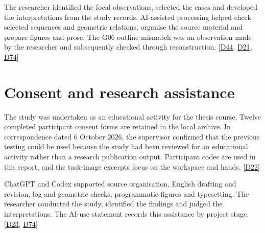 The researcher identified the focal observations, selected the cases and developed the interpretations from the study records. AI-assisted processing helped check selected sequences and geometric relations, organise the source material and prepare figures and prose. The G06 outline mismatch was an observation made by the researcher and subsequently checked through reconstruction. [\hyperlink{src:D44}{D44}, \hyperlink{src:D21}{D21}, \hyperlink{src:D74}{D74}]




\section{Consent and research assistance}\label{sec:4-6}

The study was undertaken as an educational activity for the thesis course. Twelve completed participant consent forms are retained in the local archive. In correspondence dated 6 October 2026, the supervisor confirmed that the previous testing could be used because the study had been reviewed for an educational activity rather than a research publication output. Participant codes are used in this report, and the task-image excerpts focus on the workspace and hands. [\hyperlink{src:D22}{D22}]

ChatGPT and Codex supported source organisation, English drafting and revision, log and geometric checks, programmatic figures and typesetting. The researcher conducted the study, identified the findings and judged the interpretations. The AI-use statement records this assistance by project stage. [\hyperlink{src:D23}{D23}, \hyperlink{src:D74}{D74}]


